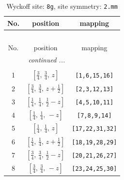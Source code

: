 \documentclass[fleqn,8pt]{jsarticle}
\begin{document}
\renewcommand{\arraystretch}{1.2}
\begin{longtable}{ccc}
\caption{Wyckoff site: {\tt 8g}, site symmetry: {\tt 2.mm}}
 \\
 \hline \hline
No. & position & mapping \\ \hline \endfirsthead

\multicolumn{2}{l}{\tablename\ \thetable{}} \\
 \hline \hline
No. & position & mapping \\ \hline \endhead

 \hline \hline
\multicolumn{2}{r}{\footnotesize\it continued ...} \\ \endfoot

 \hline \hline
\multicolumn{2}{r}{} \\ \endlastfoot

1 & $\left[ \frac{3}{4},\, \frac{3}{4},\, z \right]$ & {\tt [1,6,15,16]} \\ \hline
2 & $\left[ \frac{3}{4},\, \frac{3}{4},\, z + \frac{1}{2} \right]$ & {\tt [2,3,12,13]} \\ \hline
3 & $\left[ \frac{1}{4},\, \frac{1}{4},\, \frac{1}{2} - z \right]$ & {\tt [4,5,10,11]} \\ \hline
4 & $\left[ \frac{1}{4},\, \frac{1}{4},\, - z \right]$ & {\tt [7,8,9,14]} \\ \hline
5 & $\left[ \frac{1}{4},\, \frac{1}{4},\, z \right]$ & {\tt [17,22,31,32]} \\ \hline
6 & $\left[ \frac{1}{4},\, \frac{1}{4},\, z + \frac{1}{2} \right]$ & {\tt [18,19,28,29]} \\ \hline
7 & $\left[ \frac{3}{4},\, \frac{3}{4},\, \frac{1}{2} - z \right]$ & {\tt [20,21,26,27]} \\ \hline
8 & $\left[ \frac{3}{4},\, \frac{3}{4},\, - z \right]$ & {\tt [23,24,25,30]} \\
\end{longtable}
\renewcommand{\arraystretch}{1.2}
\end{document}
